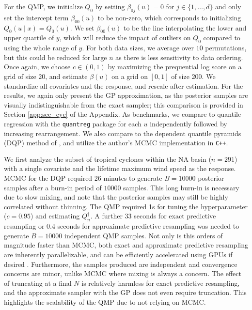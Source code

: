 \documentclass[11pt,a4paper]{article}
\begin{document}
 For the QMP, we initialize $Q_0$ by setting $\beta_{0j}(u) = 0$ for $j \in \{1,\ldots,d\}$ and only set the intercept term $\beta_{00}(u)$ to be non-zero, which corresponds to initializing $Q_0(u \mid x) = Q_0(u)$. We set $\beta_{00}(u)$ to be the line interpolating the lower and upper quartile of $y$, which will reduce the impact of outliers on $Q_0$ compared to using the whole range of $y$. For both data sizes, we  average over $10$ permutations, but this could be reduced for large $n$ as there is less sensitivity to data ordering. Once again, we choose $c\in (0,1)$ by maximizing the prequential log score on a grid of size $20$, and estimate $\beta(u)$ on a grid on $[0,1]$ of size 200. We standardize all covariates and the response, and rescale after estimation. For the results, we again only present the GP approximation, as the posterior samples are visually indistinguishable from the exact sampler; this comparison is provided in Section \ref{app:sec_cyc} of the Appendix.  
As benchmarks, we compare to quantile regression with the \texttt{quantreg} package \citep{Koenker2018} for each $u$ independently followed by increasing rearrangement. We also compare to the dependent quantile pyramids (DQP) method of \cite{An2024}, and utilize the author's MCMC implementation in \texttt{C++}. 


We first analyze the subset of tropical cyclones within the NA basin ($n = 291$) with a single covariate and the lifetime maximum wind speed as the response. MCMC for the DQP required 26 minutes to generate  $B = 10000$ posterior samples after a burn-in period of $10000$ samples. This long burn-in is necessary due to slow mixing, and note that the posterior samples may still be highly correlated without thinning.
The QMP required 1s for tuning the hyperparameter ($c = 0.95$) and estimating $Q_n^{\dagger}$. A further 33 seconds for exact predictive resampling or 0.4 seconds for approximate predictive resampling was needed to generate $B = 10000$ independent QMP samples. Not only is this orders of magnitude faster than MCMC,  both exact and approximate predictive resampling are inherently parallelizable, and can be efficiently accelerated using GPUs if desired \citep{Fong2023a}. Furthermore, the samples produced are independent and convergence concerns are minor, unlike MCMC where mixing is always a concern. The effect of truncating at a final $N$ is relatively harmless for exact predictive resampling, and the approximate sampler with the GP does not even require  truncation. This highlights the scalability of the QMP due to not relying on MCMC.
\end{document}
